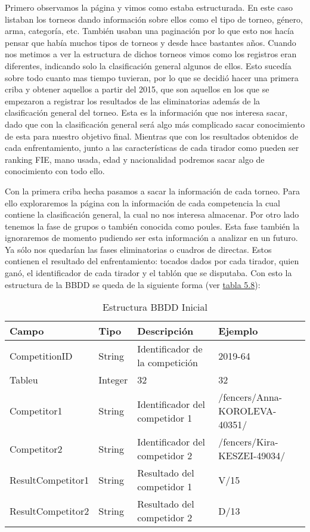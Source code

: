 Primero observamos la página y vimos como estaba estructurada. En este caso listaban
los torneos dando información sobre ellos como el tipo de torneo, género, arma, categoría,
etc. También usaban una paginación por lo que esto nos hacía pensar que había muchos tipos
de torneos y desde hace bastantes años. Cuando nos metimos a ver la estructura de dichos torneos
vimos como los registros eran diferentes, indicando solo la clasificación general algunos de ellos.
Esto sucedía sobre todo cuanto mas tiempo tuvieran, por lo que se decidió hacer una primera
criba y obtener aquellos a partir del 2015, que son aquellos en los que se empezaron a registrar
los resultados de las eliminatorias además de la clasificación general del torneo. Esta es la
información que nos interesa sacar, dado que con la clasificación general será algo más
complicado sacar conocimiento de esta para nuestro objetivo final. Mientras que con los
resultados obtenidos de cada enfrentamiento, junto a las características de cada tirador
como pueden ser ranking \acs{FIE}, mano usada, edad y nacionalidad podremos sacar algo de
conocimiento con todo ello.

Con la primera criba hecha pasamos a sacar la información de cada torneo. Para ello exploraremos
la página con la información de cada competencia la cual contiene la clasificación general,
la cual no nos interesa almacenar. Por otro lado tenemos la fase de grupos o también
conocida como poules. Esta fase también la ignoraremos de momento pudiendo ser esta
información a analizar en un futuro. Ya sólo nos quedarían las fases eliminatorias o
cuadros de directas. Estos contienen el resultado del enfrentamiento: tocados dados por cada tirador,
quien ganó, el identificador de cada tirador y el tablón que se disputaba. Con esto la estructura de la \acs{BBDD}
se queda de la siguiente forma (ver \hyperref[tab:Estructura BBDD Inicial iteracion5]{tabla 5.8}):

\begin{table}[]
  \centering
  \caption{Estructura \acs{BBDD} Inicial}
  \label{tab:Estructura BBDD Inicial iteracion5}
  \begin{tabular}{|llll|}
    \hline \rowcolor[HTML]{C0C0C0}
    Campo & Tipo & Descripción & Ejemplo \\ \hline
    CompetitionID & String & Identificador de la competición & 2019-64 \\ \hline
    Tableu & Integer & 32 & 32 \\ \hline
    Competitor1 & String & Identificador del competidor 1 & /fencers/Anna-KOROLEVA-40351/ \\ \hline
    Competitor2 & String & Identificador del competidor 2 & /fencers/Kira-KESZEI-49034/ \\ \hline
    ResultCompetitor1 & String & Resultado del competidor 1 & V/15 \\ \hline
    ResultCompetitor2 & String & Resultado del competidor 2 & D/13 \\ \hline
  \end{tabular}
\end{table}

